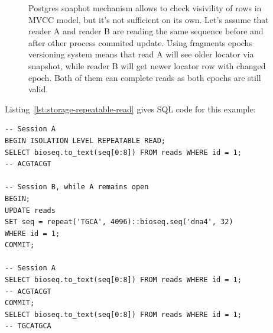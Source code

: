 \begin{figure}[htbp]
\centering
{}
\caption{Postgres snaphot mechanism allows to check visivility of rows in MVCC model, but it's not sufficient on its own.
Let's assume that reader A and reader B are reading the same sequence before and after other process commited update.
Using fragments epochs versioning system means that read A will see older locator via snapshot, while reader B will
get newer locator row with changed epoch. Both of them can complete reads as both epochs are still valid. 
}
\label{fig:storage-update-snapshots}
\end{figure}

Listing~\ref{lst:storage-repeatable-read} gives SQL code for this example:

\begin{lstlisting}[style=bioseq-storage-sql,float=htbp,
  label={lst:storage-repeatable-read},
  caption={A repeatable-read transaction keeps the old sequence version.
    Initially, row id 1 begins with ACGTACGT.}]
-- Session A
BEGIN ISOLATION LEVEL REPEATABLE READ;
SELECT bioseq.to_text(seq[0:8]) FROM reads WHERE id = 1;
-- ACGTACGT

-- Session B, while A remains open
BEGIN;
UPDATE reads
SET seq = repeat('TGCA', 4096)::bioseq.seq('dna4', 32)
WHERE id = 1;
COMMIT;

-- Session A
SELECT bioseq.to_text(seq[0:8]) FROM reads WHERE id = 1;
-- ACGTACGT
COMMIT;
SELECT bioseq.to_text(seq[0:8]) FROM reads WHERE id = 1;
-- TGCATGCA
\end{lstlisting}

